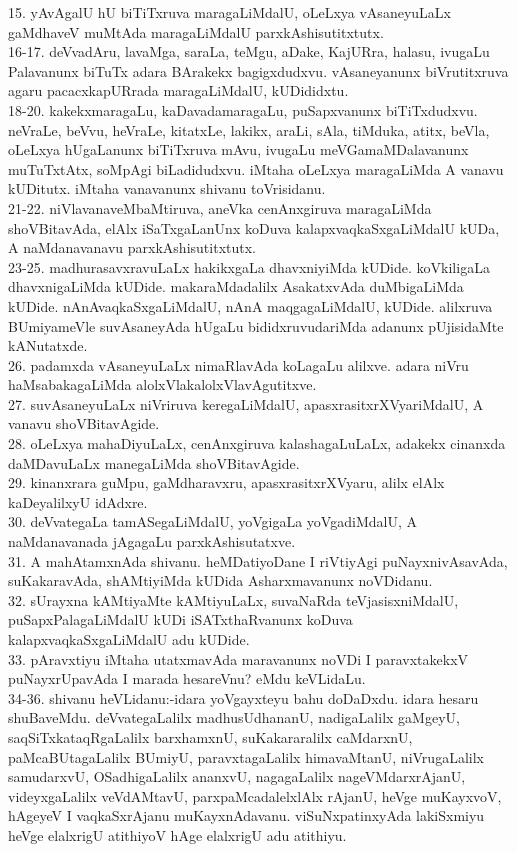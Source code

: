 \documentclass{article}
\begin{document}
15. yAvAgalU hU biTiTxruva maragaLiMdalU, oLeLxya vAsaneyuLaLx gaMdhaveV muMtAda maragaLiMdalU parxkAshisutitxtutx.\\
16-17. deVvadAru, lavaMga, saraLa, teMgu, aDake, KajURra, halasu, ivugaLu Palavanunx biTuTx adara BArakekx bagigxdudxvu. vAsaneyanunx biVrutitxruva agaru pacacxkapURrada maragaLiMdalU, kUDididxtu.\\
18-20. kakekxmaragaLu, kaDavadamaragaLu, puSapxvanunx biTiTxdudxvu. neVraLe, beVvu, heVraLe, kitatxLe, lakikx, araLi, sAla, tiMduka, atitx, beVla, oLeLxya hUgaLanunx biTiTxruva mAvu, ivugaLu meVGamaMDalavanunx muTuTxtAtx, soMpAgi biLadidudxvu. iMtaha oLeLxya maragaLiMda A vanavu kUDitutx. iMtaha vanavanunx shivanu toVrisidanu.\\
21-22. niVlavanaveMbaMtiruva, aneVka cenAnxgiruva maragaLiMda shoVBitavAda, elAlx iSaTxgaLanUnx koDuva kalapxvaqkaSxgaLiMdalU kUDa, A naMdanavanavu parxkAshisutitxtutx.\\
23-25. madhurasavxravuLaLx hakikxgaLa dhavxniyiMda kUDide. koVkiligaLa dhavxnigaLiMda kUDide. makaraMdadalilx AsakatxvAda duMbigaLiMda kUDide. nAnAvaqkaSxgaLiMdalU, nAnA maqgagaLiMdalU, kUDide. alilxruva BUmiyameVle suvAsaneyAda hUgaLu bididxruvudariMda adanunx pUjisidaMte kANutatxde.\\
26. padamxda vAsaneyuLaLx nimaRlavAda koLagaLu alilxve. adara niVru haMsabakagaLiMda alolxVlakalolxVlavAgutitxve.\\
27. suvAsaneyuLaLx niVriruva keregaLiMdalU, apasxrasitxrXVyariMdalU, A vanavu shoVBitavAgide.\\
28. oLeLxya mahaDiyuLaLx, cenAnxgiruva kalashagaLuLaLx, adakekx cinanxda daMDavuLaLx manegaLiMda shoVBitavAgide.\\
29. kinanxrara guMpu, gaMdharavxru, apasxrasitxrXVyaru, alilx elAlx kaDeyalilxyU idAdxre.\\
30. deVvategaLa tamASegaLiMdalU, yoVgigaLa yoVgadiMdalU, A naMdanavanada jAgagaLu parxkAshisutatxve.\\
31. A mahAtamxnAda shivanu. heMDatiyoDane I riVtiyAgi puNayxnivAsavAda, suKakaravAda, shAMtiyiMda kUDida Asharxmavanunx noVDidanu.\\
32. sUrayxna kAMtiyaMte kAMtiyuLaLx, suvaNaRda teVjasisxniMdalU, puSapxPalagaLiMdalU kUDi iSATxthaRvanunx koDuva kalapxvaqkaSxgaLiMdalU adu kUDide.\\
33. pAravxtiyu iMtaha utatxmavAda maravanunx noVDi I paravxtakekxV puNayxrUpavAda I marada hesareVnu? eMdu keVLidaLu.\\
34-36. shivanu heVLidanu:-idara yoVgayxteyu bahu doDaDxdu. idara hesaru shuBaveMdu. deVvategaLalilx madhusUdhananU, nadigaLalilx gaMgeyU, saqSiTxkataqRgaLalilx barxhamxnU, suKakararalilx caMdarxnU, paMcaBUtagaLalilx BUmiyU, paravxtagaLalilx himavaMtanU, niVrugaLalilx samudarxvU, OSadhigaLalilx ananxvU, nagagaLalilx nageVMdarxrAjanU, videyxgaLalilx veVdAMtavU, parxpaMcadalelxlAlx rAjanU, heVge muKayxvoV, hAgeyeV I vaqkaSxrAjanu muKayxnAdavanu. viSuNxpatinxyAda lakiSxmiyu heVge elalxrigU atithiyoV hAge elalxrigU adu atithiyu.\\
\end{document}
